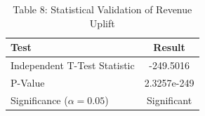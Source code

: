 
\begin{table}[h]
\centering
\begin{tabular}{|l|c|}
\hline
\textbf{Test} & \textbf{Result} \\
\hline
Independent T-Test Statistic & -249.5016 \\
P-Value & 2.3257e-249 \\
Significance ($\alpha=0.05$) & Significant \\
\hline
\end{tabular}
\caption{Table 8: Statistical Validation of Revenue Uplift}
\end{table}
